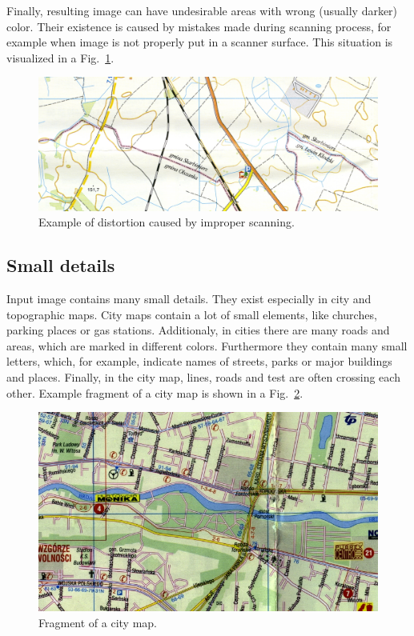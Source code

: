 \documentclass[a4paper,onecolumn,oneside,12pt]{memoir}
\begin{document}
Finally, resulting image can have undesirable areas with wrong (usually darker) color. Their
existence is caused by mistakes made during scanning process, for example when image is not properly
put in a scanner surface. This situation is visualized in a Fig.~\ref{badScanExample}.

\begin{figure}[!ht]
\begin{center}
\includegraphics[scale=1.3]{images/badScanExample.jpg}
\caption{Example of distortion caused by improper scanning.}
\label{badScanExample}
\end{center}
\end{figure}

\subsection{Small details}

Input image contains many small details. They exist especially in city and topographic maps.
City maps contain a lot of small elements, like churches, parking places or gas stations.
Additionaly, in cities there are many roads and areas, which are marked in different colors. 
Furthermore they contain many small letters, which, for example, indicate names of streets, parks
or major buildings and places. Finally, in the city map, lines, roads and test are often crossing
each other. Example fragment of a city map is shown in a Fig.~\ref{cityExample}.

\begin{figure}[!ht]
\begin{center}
\includegraphics[scale=0.65]{images/cityExample.jpg}
\caption{Fragment of a city map.}
\label{cityExample}
\end{center}
\end{figure}
\end{document}
